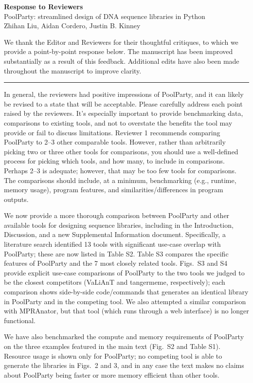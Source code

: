 \documentclass[11pt]{article}
\newenvironment{response}{\par\color{responseblue}}{\par}
\newcommand{\reviewersection}[1]{%
  \bigskip\par\noindent{\large\bfseries #1}\par\medskip\hrule\medskip}
\begin{document}
\begin{center}
{\Large\bfseries Response to Reviewers}\\[0.6em]
{\large PoolParty: streamlined design of DNA sequence libraries in Python}\\[0.8em]
Zhihan Liu, Aidan Cordero, Justin B. Kinney\\[0.7em]
\end{center}

\begin{response}
We thank the Editor and Reviewers for their thoughtful critiques, to which we provide a point-by-point response below. The manuscript has been improved substantially as a result of this feedback. Additional edits have also been made throughout the manuscript to improve clarity. 
\end{response}

\reviewersection{Editor Comments}

In general, the reviewers had positive impressions of PoolParty, and it can
likely be revised to a state that will be acceptable. Please carefully address
each point raised by the reviewers. It's especially important to provide
benchmarking data, comparisons to existing tools, and not to overstate the
benefits the tool may provide or fail to discuss limitations. Reviewer 1
recommends comparing PoolParty to 2--3 other comparable tools. However, rather
than arbitrarily picking two or three other tools for comparisons, you should
use a well-defined process for picking which tools, and how many, to include in
comparisons. Perhaps 2--3 is adequate; however, that may be too few tools for
comparisons. The comparisons should include, at a minimum, benchmarking (e.g.,
runtime, memory usage), program features, and similarities/differences in
program outputs.

\begin{response}
We now provide a more thorough comparison between PoolParty and other available tools for designing sequence libraries, including in the Introduction, Discussion, and a new Supplemental Information document. Specifically, a literature search identified 13 tools with significant use-case overlap with PoolParty; these are now listed in Table S2. Table S3 compares the specific features of PoolParty and the 7 most closely related tools. Figs.~S3 and S4 provide explicit use-case comparisons of PoolParty to the two tools we judged to be the closest competitors (VaLiAnT and tangermeme, respectively);  each comparison shows side-by-side code/commands that generates an identical library in PoolParty and in the competing tool. We also attempted a similar comparison with MPRAnator, but that tool (which runs through a web interface) is no longer functional. 

We have also benchmarked the compute and memory requirements of PoolParty on the three examples featured in the main text (Fig.~S2 and Table S1). Resource usage is shown only for PoolParty; no competing tool is able to generate the libraries in Figs.~2 and 3, and in any case the text makes no claims about PoolParty being faster or more memory efficient than other tools.
\end{response}
\end{document}
